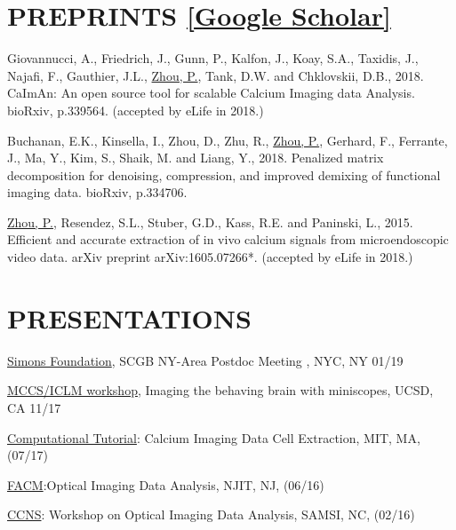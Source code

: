 \documentclass[paper=letter,fontsize=11pt]{scrartcl} %
\newcommand{\NewPart}[2]{\section*{\uppercase{#1} #2}}
\newcommand{\TalkEntry}[4]{
		\noindent #1, #2, #3 #4}
\begin{document}
\NewPart{Preprints}{\href{http://scholar.google.com/citations?hl=en&user=hw0JvzAAAAAJ}{[Google Scholar]}}

\begin{etaremune}

\item Giovannucci, A., Friedrich, J., Gunn, P., Kalfon, J., Koay, S.A., Taxidis, J., Najafi, F., Gauthier, J.L., \ul{Zhou, P.}, Tank, D.W. and Chklovskii, D.B., 2018. CaImAn: An open source tool for scalable Calcium Imaging data Analysis. bioRxiv, p.339564. ({\color{blue}accepted by eLife in 2018}.)

\item Buchanan, E.K., Kinsella, I., Zhou, D., Zhu, R., \ul{Zhou, P.}, Gerhard, F., Ferrante, J., Ma, Y., Kim, S., Shaik, M. and Liang, Y., 2018. Penalized matrix decomposition for denoising, compression, and improved demixing of functional imaging data. bioRxiv, p.334706.

\item \ul{Zhou, P.}, Resendez, S.L., Stuber, G.D., Kass, R.E. and Paninski, L., 2015. Efficient and accurate extraction of in vivo calcium signals from microendoscopic video data. arXiv preprint arXiv:1605.07266*. ({\color{blue}accepted by eLife in 2018}.)
\end{etaremune}







\NewPart{Presentations}{}
\begin{etaremune}
\item \TalkEntry{\href{https://www.simonsfoundation.org/event/scgb-ny-area-postdoc-meeting/}{Simons Foundation}}{SCGB NY-Area Postdoc Meeting }{NYC, NY}{01/19}%
\item \TalkEntry{\href{http://www.silvalab.org/page/MiniscopeWorkshop.html}{ MCCS/ICLM workshop}}{ Imaging the behaving brain with miniscopes}{UCSD, CA}{11/17}%
\item \TalkEntry{\href{https://bcs.mit.edu/news-events/events/computational-tutorial-calcium-imaging-data-cell-extraction}{Computational Tutorial}: Calcium Imaging Data Cell Extraction}{MIT, MA}{(07/17)}%
\item\TalkEntry{\href{https://m.njit.edu/Events/FACM16/program.html}{FACM}:Optical Imaging Data Analysis}{NJIT, NJ}{(06/16)}%

\item\TalkEntry{\href{https://www.samsi.info/programs-and-activities/research-workshops/2015-16-ccns-workshop-on-optical-imaging-data-analysis-february-1-2-2016/}{CCNS}: Workshop on Optical Imaging Data Analysis}{SAMSI, NC}{(02/16)}%

\end{etaremune}
\end{document}
